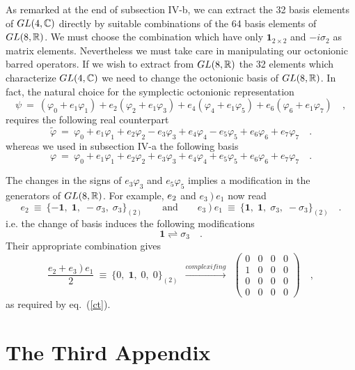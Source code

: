 \documentclass[a4paper,12pt]{book}
\begin{document}
As remarked at the end of subsection IV-b, we can extract the 32 basis
elements of $GL(4,\Bbb{C})$ directly by suitable combinations of the 64
basis elements of $GL(8,\Bbb{R})$. We must choose the combination which have
only $\mathbf{1}_{2\times 2}$ and $-i\sigma _{2}$ as matrix elements.
Nevertheless we must take care in manipulating our octonionic barred
operators. If we wish to extract from $GL(8,\Bbb{R})$ the 32 elements which
characterize $GL(4,\Bbb{C})$ we need to change the octonionic basis of $GL(8,%
\Bbb{R})$. In fact, the natural choice for the symplectic octonionic
representation 
\[
\psi ~=~(\varphi _{0}+e_{1}\varphi _{1})+e_{2}(\varphi _{2}+e_{1}\varphi
_{3})+e_{4}(\varphi _{4}+e_{1}\varphi _{5})+e_{6}(\varphi _{6}+e_{1}\varphi
_{7})\quad , 
\]
requires the following real counterpart 
\[
\tilde{\varphi}~=~\varphi _{0}+e_{1}\varphi _{1}+e_{2}\varphi
_{2}-e_{3}\varphi _{3}+e_{4}\varphi _{4}-e_{5}\varphi _{5}+e_{6}\varphi
_{6}+e_{7}\varphi _{7}\quad . 
\]
whereas we used in subsection IV-a the following basis 
\[
\varphi ~=~\varphi _{0}+e_{1}\varphi _{1}+e_{2}\varphi _{2}+e_{3}\varphi
_{3}+e_{4}\varphi _{4}+e_{5}\varphi _{5}+e_{6}\varphi _{6}+e_{7}\varphi
_{7}\quad . 
\]

The changes in the signs of $e_{3}\varphi _{3}$ and $e_{5}\varphi _{5}$
implies a modification in the generators of $GL(8,\Bbb{R})$. For example, ${%
e_{2}}$ and ${e_{3}~)~e_{1}}$ now read 
\[
{e_{2}}~\equiv ~\{-\mathbf{1},\;\mathbf{1},\;-\sigma _{3},\;\sigma
_{3}\}_{(2)}\quad \quad \mbox{and}\quad \quad {e_{3}~)~e_{1}}~\equiv ~\{%
\mathbf{1},\;\mathbf{1},\;\sigma _{3},\;-\sigma _{3}\}_{(2)}\quad . 
\]
i.e. the change of basis induces the following modifications 
\[
\mathbf{1}\rightleftharpoons \sigma _{3}\quad . 
\]
Their appropriate combination gives 
\[
\frac{{e_{2}}+{e_{3}~)~e_{1}}}{2}~\equiv ~\{0,\;\mathbf{1},\;0,\;0\}_{(2)}~~%
\stackrel{complexifing}{\longrightarrow }~~\left( 
\begin{array}{cccc}
0 & 0 & 0 & 0 \\ 
1 & 0 & 0 & 0 \\ 
0 & 0 & 0 & 0 \\ 
0 & 0 & 0 & 0
\end{array}
\right) \quad , 
\]
as required by eq.~(\ref{ct}).\newpage

\chapter{The Third Appendix}

\end{document}
